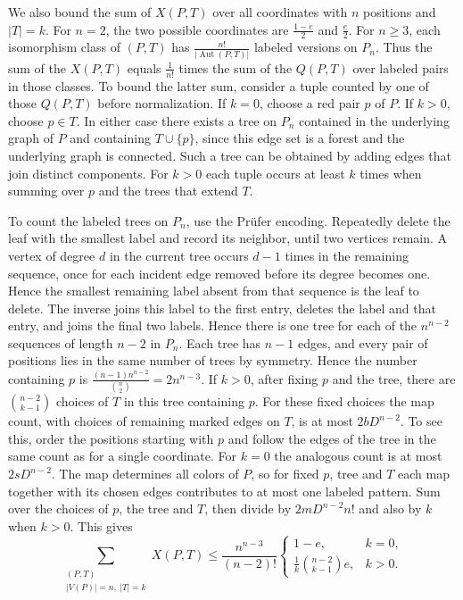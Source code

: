 \documentclass[preprint,11pt,numbers]{elsarticle-arxiv}
\numberwithin{equation}{section}
\theoremstyle{definition}
\begin{document}
We also bound the sum of $X(P,T)$ over all coordinates with
$n$ positions and $|T|=k$. For $n=2$, the two possible coordinates
are $\frac{1-e}{2}$ and $\frac{e}{2}$. For $n\geq3$, each
isomorphism class of $(P,T)$ has
$\frac{n!}{|\operatorname{Aut}(P,T)|}$ labeled versions on
$P_n$. Thus the sum of the $X(P,T)$ equals $\frac{1}{n!}$ times
the sum of the $Q(P,T)$ over labeled pairs in those classes.
To bound the latter sum, consider a tuple counted by one of those
$Q(P,T)$ before normalization. If $k=0$, choose a red pair $p$
of $P$. If $k>0$, choose $p\in T$. In either case there exists
a tree on $P_n$ contained in the underlying graph of $P$ and
containing $T\cup\{p\}$, since this edge set is a forest and
the underlying graph is connected. Such a tree can be obtained
by adding edges that join distinct components. For $k>0$ each
tuple occurs at least $k$ times when summing over $p$ and the
trees that extend $T$.

To count the labeled trees on $P_n$, use the Pr\"ufer encoding.
Repeatedly delete the leaf with the smallest label and record
its neighbor, until two vertices remain. A vertex of degree $d$
in the current tree occurs $d-1$ times in the remaining sequence,
once for each incident edge removed before its degree becomes one.
Hence the smallest remaining label absent from that sequence is
the leaf to delete. The inverse joins this label
to the first entry, deletes the label and that entry, and joins the
final two labels. Hence there is one tree for each of the $n^{n-2}$
sequences of length $n-2$ in $P_n$.
Each tree has $n-1$ edges, and every pair of positions lies in
the same number of trees by symmetry. Hence the number containing
$p$ is $\frac{(n-1)n^{n-2}}{\binom{n}{2}}=2n^{n-3}$.
If $k>0$, after fixing $p$ and the tree, there are
$\binom{n-2}{k-1}$ choices of $T$ in this tree containing $p$.
For these fixed choices the map count, with choices of remaining
marked edges on $T$, is at most $2bD^{n-2}$. To see this, order the
positions starting with $p$ and follow the edges of the tree in
the same count as for a single coordinate. For $k=0$ the analogous
count is at most $2sD^{n-2}$. The map determines all colors of $P$,
so for fixed $p$, tree and $T$ each map together with its chosen
edges contributes to at most one labeled pattern. Sum over
the choices of $p$, the tree and $T$, then
divide by $2mD^{n-2}n!$ and also by $k$ when $k>0$. This gives
\[
 \sum_{\substack{(P,T)\\ |V(P)|=n,\ |T|=k}}X(P,T)
 \leq\frac{n^{n-3}}{(n-2)!}
 \begin{cases}
 1-e,& k=0,\\[2pt]
 \displaystyle\frac{1}{k}\binom{n-2}{k-1}e,& k>0.
 \end{cases}
\]
\end{document}
